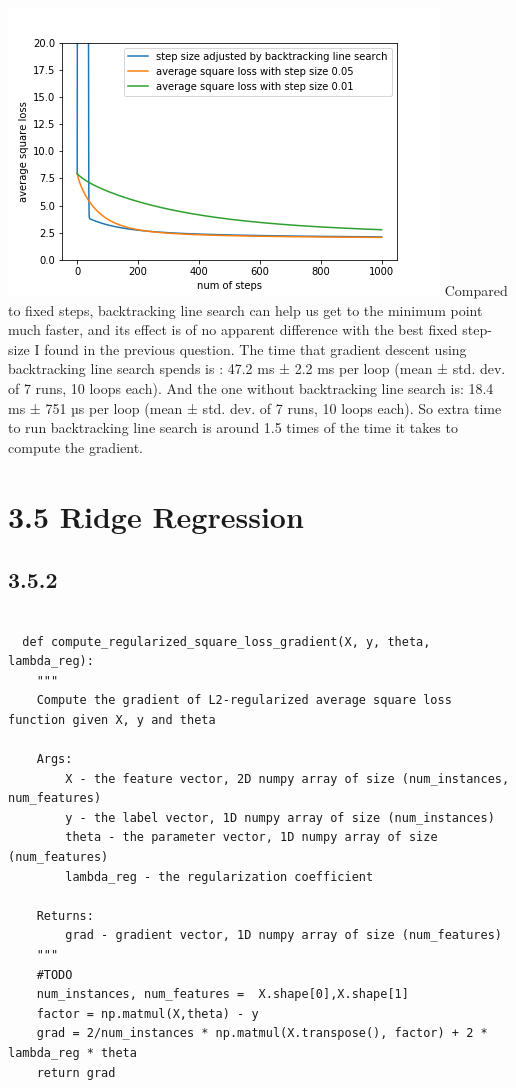 \documentclass{article}
\begin{document}
\includegraphics[scale=1.2]{343.png}
Compared to fixed steps, backtracking line search can help us get to the minimum point much faster, and its effect is of no apparent difference with the best fixed step-size I found in the previous question.
The time that gradient descent using backtracking line search spends is :
47.2 ms ± 2.2 ms per loop (mean ± std. dev. of 7 runs, 10 loops each).
And the one without backtracking line search is:
18.4 ms ± 751 µs per loop (mean ± std. dev. of 7 runs, 10 loops each).
So extra time to run backtracking line search is around 1.5 times of the time it takes to compute the gradient.
\endsubsection

\section{3.5 Ridge Regression}
\subsection{3.5.2}
\begin{verbatim}
  
  def compute_regularized_square_loss_gradient(X, y, theta, lambda_reg):
    """
    Compute the gradient of L2-regularized average square loss function given X, y and theta

    Args:
        X - the feature vector, 2D numpy array of size (num_instances, num_features)
        y - the label vector, 1D numpy array of size (num_instances)
        theta - the parameter vector, 1D numpy array of size (num_features)
        lambda_reg - the regularization coefficient

    Returns:
        grad - gradient vector, 1D numpy array of size (num_features)
    """
    #TODO
    num_instances, num_features =  X.shape[0],X.shape[1]
    factor = np.matmul(X,theta) - y
    grad = 2/num_instances * np.matmul(X.transpose(), factor) + 2 * lambda_reg * theta
    return grad
\end{verbatim}
\end{document}
